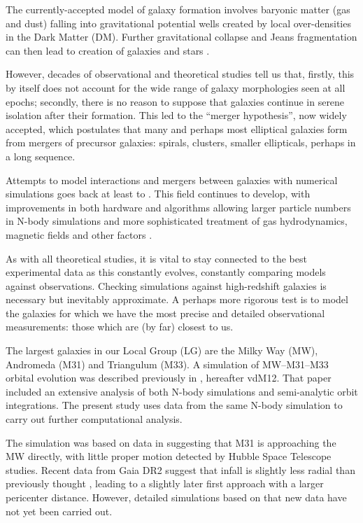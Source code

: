 \documentclass[twocolumn]{aastex63}
\begin{document}
The currently-accepted model of galaxy formation involves baryonic matter (gas and dust) falling into gravitational potential wells created by local over-densities in the Dark Matter (DM). Further gravitational collapse and Jeans fragmentation can then lead to creation of galaxies and stars \citep{mo_galaxy_2010}.

However, decades of observational and theoretical studies tell us that, firstly, this by itself does not account for the wide range of galaxy morphologies seen at all epochs; secondly, there is no reason to suppose that galaxies continue in serene isolation after their formation. This led to the ``merger hypothesis'', now widely accepted, which postulates that many and perhaps most elliptical galaxies form from mergers of precursor galaxies: spirals, clusters, smaller ellipticals, perhaps in a long sequence.

Attempts to model interactions and mergers between galaxies with numerical simulations goes back at least to \citet{toomre_galactic_1972}.  This field continues to develop, with improvements in both hardware and algorithms allowing larger particle numbers in N-body simulations and more sophisticated treatment of gas hydrodynamics, magnetic fields and other factors \citep{bodenheimer_numerical_2007}.

As with all theoretical studies, it is vital to stay connected to the best experimental data as this constantly evolves, constantly comparing models against observations. Checking simulations against high-redshift galaxies is necessary but inevitably approximate. A perhaps more rigorous test is to model the galaxies for which we have the most precise and detailed observational measurements: those which are (by far) closest to us. 

The largest galaxies in our Local Group (LG) are the Milky Way (MW), Andromeda (M31) and Triangulum (M33).  A simulation of MW--M31--M33 orbital evolution was described previously in \citet{marel_m31_2012}, hereafter vdM12. That paper included an extensive analysis of both N-body simulations and semi-analytic orbit integrations. The present study uses data from the same N-body simulation to carry out further computational analysis.

The simulation was based on data in \citet{marel_m31_2012-1} suggesting that M31 is approaching the MW directly, with little proper motion detected by Hubble Space Telescope studies. Recent data from Gaia DR2 \citep{brown_gaia_2018} suggest that infall is slightly less radial than previously thought \citep{marel_first_2019}, leading to a slightly later first approach with a larger pericenter distance. However, detailed simulations based on that new data have not yet been carried out.
\end{document}
